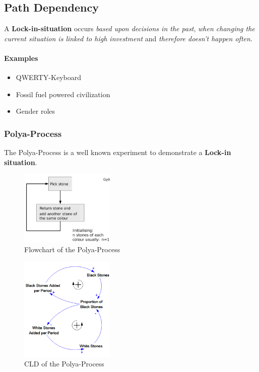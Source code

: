 \subsection{Path Dependency}

A \textbf{Lock-in-situation} occurs \textit{based upon decisions in the past},
\textit{when changing the current situation is linked to high investment} and
\textit{therefore doesn't happen often.}

\paragraph{Examples}

\begin{itemize}
	\item QWERTY-Keyboard
	\item Fossil fuel powered civilization
	\item Gender roles
\end{itemize}

\subsubsection{Polya-Process}

The Polya-Process is a well known experiment to demonstrate a \textbf{Lock-in
situation}.

\begin{figure}[H]
	\centering
	\includegraphics[width=0.4\textwidth]{figures/PolyaProcess.png}
	\caption{Flowchart of the Polya-Process}
\end{figure}

\begin{figure}[H]
	\centering
	\includegraphics[width=0.4\textwidth]{figures/PolyaProcessCLD.png}
	\caption{CLD of the Polya-Process}
\end{figure}
